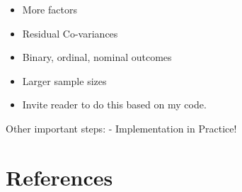 \documentclass[
  man, donotrepeattitle,floatsintext]{apa6}
\providecommand{\tightlist}{%
  \setlength{\itemsep}{0pt}\setlength{\parskip}{0pt}}
\begin{document}
\begin{itemize}
\tightlist
\item
  More factors
\item
  Residual Co-variances
\item
  Binary, ordinal, nominal outcomes
\item
  Larger sample sizes
\item
  Invite reader to do this based on my code.
\end{itemize}

Other important steps:
- Implementation in Practice!

\clearpage

\hypertarget{references}{%
\section{References}\label{references}}

\begingroup
\setlength{\parindent}{-0.5in}
\setlength{\leftskip}{0.5in}
\end{document}
